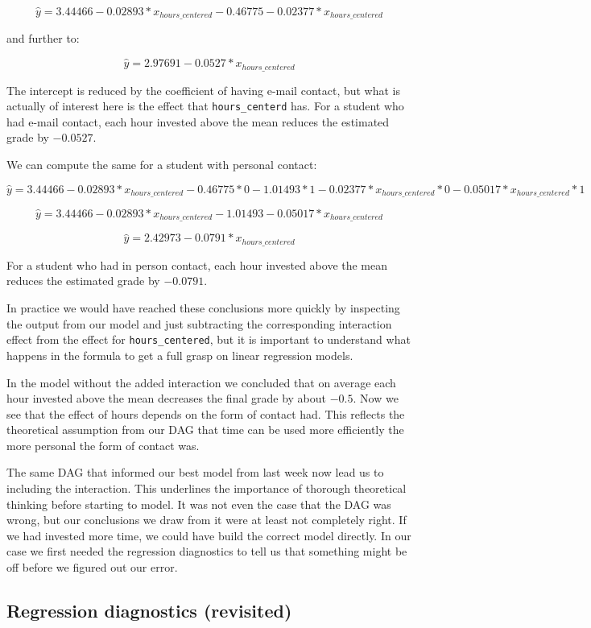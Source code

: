 \documentclass[
]{book}
\begin{document}
\[\hat{y} = 3.44466 -0.02893 *x_{hours\_centered} -0.46775 -0.02377 * x_{hours\_centered}\]

and further to:

\[\hat{y} = 2.97691 -0.0527 *x_{hours\_centered}\]

The intercept is reduced by the coefficient of having e-mail contact, but what
is actually of interest here is the effect that \texttt{hours\_centerd} has. For a
student who had e-mail contact, each hour invested above the mean reduces the
estimated grade by \(-0.0527\).

We can compute the same for a student with personal contact:

\[\hat{y} = 3.44466 -0.02893 * x_{hours\_centered} -0.46775 * 0
-1.01493 * 1 
-0.02377 * x_{hours\_centered} * 0 
-0.05017 * x_{hours\_centered} * 1\]

\[\hat{y} = 3.44466 -0.02893 *x_{hours\_centered} -1.01493 -0.05017 * x_{hours\_centered}\]

\[\hat{y} = 2.42973 -0.0791 *x_{hours\_centered}\]

For a student who had in person contact, each hour invested above the mean
reduces the estimated grade by \(-0.0791\).

In practice we would have reached these conclusions more quickly by inspecting
the output from our model and just subtracting the corresponding interaction
effect from the effect for \texttt{hours\_centered}, but it is important to
understand what happens in the formula to get a full grasp on linear
regression models.

In the model without the added interaction we concluded that on average each
hour invested above the mean decreases the final grade by about \(-0.5\). Now we
see that the effect of hours depends on the form of contact had. This reflects
the theoretical assumption from our DAG that time can be used more efficiently
the more personal the form of contact was.

The same DAG that informed our best model from last week now lead us to
including the interaction. This underlines the importance of thorough
theoretical thinking before starting to model. It was not even the case that
the DAG was wrong, but our conclusions we draw from it were at least not
completely right. If we had invested more time, we
could have build the correct model directly. In our case we first needed the
regression diagnostics to tell us that something might be off before we figured
out our error.

\hypertarget{regression-diagnostics-revisited}{%
\subsection{Regression diagnostics (revisited)}\label{regression-diagnostics-revisited}}
\end{document}

